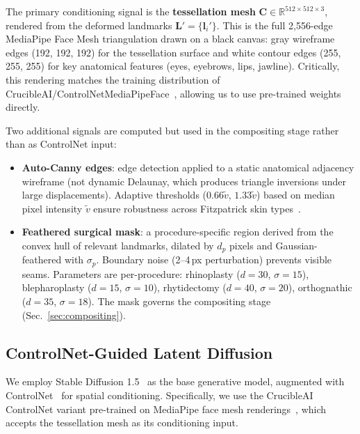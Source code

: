 \documentclass[runningheads]{llncs}
\newcommand{\RR}{\mathbb{R}}
\begin{document}
The primary conditioning signal is the \textbf{tessellation mesh}
$\mathbf{C} \in \RR^{512 \times 512 \times 3}$, rendered from the
deformed landmarks $\mathbf{L}' = \{\mathbf{l}_i'\}$.  This is the full
2,556-edge MediaPipe Face Mesh triangulation drawn on a black canvas:
gray wireframe edges (192, 192, 192) for the tessellation surface and
white contour edges (255, 255, 255) for key anatomical features (eyes,
eyebrows, lips, jawline).  Critically, this rendering matches the
training distribution of
CrucibleAI/ControlNetMediaPipeFace~\cite{crucibleai_controlnet},
allowing us to use pre-trained weights directly.

Two additional signals are computed but used in the compositing stage
rather than as ControlNet input:

\begin{itemize}
    \item \textbf{Auto-Canny edges}: edge detection applied to a static
    anatomical adjacency wireframe (not dynamic Delaunay, which produces
    triangle inversions under large displacements).  Adaptive thresholds
    ($0.66\tilde{v}$, $1.33\tilde{v}$) based on median pixel intensity
    $\tilde{v}$ ensure robustness across Fitzpatrick skin
    types~\cite{chardon1991ita}.

    \item \textbf{Feathered surgical mask}: a procedure-specific region
    derived from the convex hull of relevant landmarks, dilated by $d_p$
    pixels and Gaussian-feathered with $\sigma_p$.  Boundary noise
    (2--4\,px perturbation) prevents visible seams.  Parameters are
    per-procedure: rhinoplasty ($d=30$, $\sigma=15$), blepharoplasty
    ($d=15$, $\sigma=10$), rhytidectomy ($d=40$, $\sigma=20$),
    orthognathic ($d=35$, $\sigma=18$).  The mask governs the compositing
    stage (Sec.~\ref{sec:compositing}).
\end{itemize}

\subsection{ControlNet-Guided Latent Diffusion}
\label{sec:diffusion}

We employ Stable Diffusion 1.5~\cite{rombach2022ldm} as the base
generative model, augmented with ControlNet~\cite{zhang2023controlnet}
for spatial conditioning.  Specifically, we use the CrucibleAI
ControlNet variant pre-trained on MediaPipe face mesh
renderings~\cite{crucibleai_controlnet}, which accepts the tessellation
mesh as its conditioning input.
\end{document}
